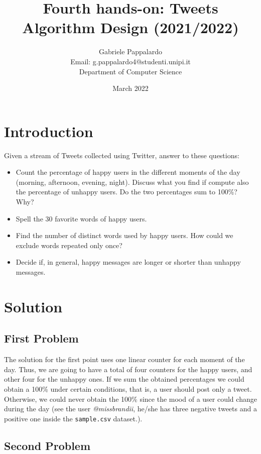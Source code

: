 \documentclass{article}
\title{Fourth hands-on: Tweets \\[1ex] \large Algorithm Design (2021/2022)}
\author{Gabriele Pappalardo\\Email: g.pappalardo4@studenti.unipi.it\\Department of Computer Science}
\date{March 2022}
\begin{document}
\maketitle

\section{Introduction}

Given a stream of Tweets collected using Twitter, answer to these questions:
\begin{itemize}
    \item Count the percentage of happy users in the different moments of the day (morning, afternoon, evening, night). Discuss what you find if compute also the percentage of unhappy users. Do the two percentages sum to 100\%? Why?
    
    \item Spell the 30 favorite words of happy users.
    
    \item Find the number of distinct words used by happy users. How could we exclude words repeated only once?

    \item Decide if, in general, happy messages are longer or shorter than unhappy messages.    
\end{itemize}

\section{Solution}

\subsection{First Problem}

The solution for the first point uses one linear counter for each moment of the day. Thus, we are going to have a total of four counters for the happy users, and other four for the unhappy ones. If we sum the obtained percentages we could obtain
a 100\% under certain conditions, that is, a user should post only a tweet. Otherwise, we could never obtain the 100\% since the mood
of a user could change during the day (see the user \textit{@missbrandii}, he/she has three negative tweets and a positive one inside the \verb+sample.csv+ dataset.). \newline

\subsection{Second Problem}
\end{document}
